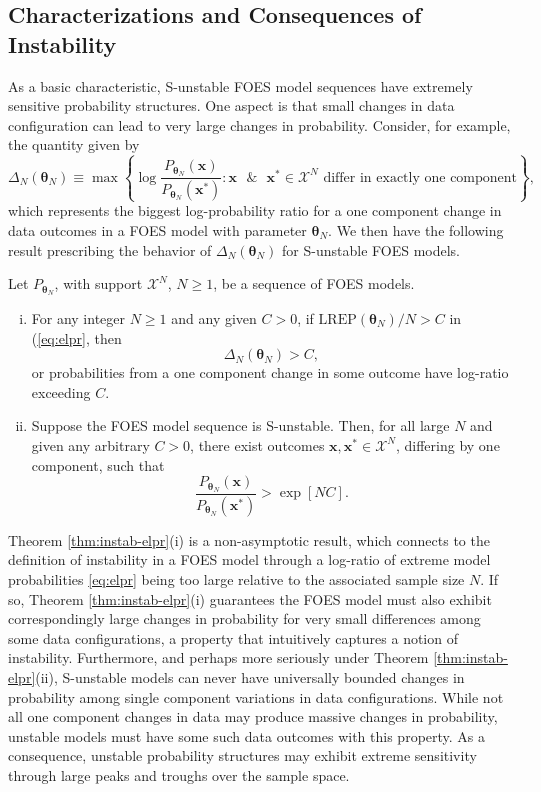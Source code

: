 \documentclass[]{article}
\theoremstyle{definition}
\newcommand{\REP}{\mathrm{LREP}}
\newcommand{\DN}{\Delta_N}
\let\BeginKnitrBlock\begin \let\EndKnitrBlock\end
\begin{document}
\subsection{Characterizations and Consequences of
Instability}\label{characterizations-and-consequences-of-instability}

As a basic characteristic, S-unstable FOES model sequences have
extremely sensitive probability structures. One aspect is that small
changes in data configuration can lead to very large changes in
probability. Consider, for example, the quantity given by \[
\DN(\boldsymbol \theta_N) \equiv \max \left\{\log \frac{P_{\boldsymbol \theta_N}(\boldsymbol x)}{P_{\boldsymbol \theta_N}(\boldsymbol x^*)} : \boldsymbol x \text{ }\& \text{ } \boldsymbol x^* \in \mathcal{X}^N \text{ differ in exactly one component}\right\},
\] which represents the biggest log-probability ratio for a one
component change in data outcomes in a FOES model with parameter
\(\boldsymbol \theta_N\). We then have the following result prescribing
the behavior of \(\DN(\boldsymbol \theta_N)\) for S-unstable FOES
models.

\BeginKnitrBlock{theorem}
\protect\hypertarget{thm:instab-elpr}{}{\label{thm:instab-elpr}}Let
\(P_{\boldsymbol \theta_N}\), with support \(\mathcal{X}^N\),
\(N\geq 1\), be a sequence of FOES models.
\begin{enumerate}[(i)]
\item For any integer $N \geq 1$ and any given $C>0$, if $\REP(\boldsymbol \theta_N)/N > C$ in (\ref{eq:elpr}, then
    $$ \DN(\boldsymbol \theta_N) > C,$$
    or probabilities from a one component change in some outcome have log-ratio exceeding $C$.
\item Suppose the FOES model sequence is S-unstable. Then, for all large $N$ and given any arbitrary $C>0$, there exist outcomes $\boldsymbol x,\boldsymbol x^*\in\mathcal{X}^N$, differing by one component, such that
    $$
    \frac{P_{\boldsymbol \theta_N}(\boldsymbol x)}{P_{\boldsymbol \theta_N}(\boldsymbol x^*)} > \exp[N C].
    $$
\end{enumerate}
\EndKnitrBlock{theorem}

Theorem \ref{thm:instab-elpr}(i) is a non-asymptotic result, which
connects to the definition of instability in a FOES model through a
log-ratio of extreme model probabilities \eqref{eq:elpr} being too large
relative to the associated sample size \(N\). If so, Theorem
\ref{thm:instab-elpr}(i) guarantees the FOES model must also exhibit
correspondingly large changes in probability for very small differences
among some data configurations, a property that intuitively captures a
notion of instability. Furthermore, and perhaps more seriously under
Theorem \ref{thm:instab-elpr}(ii), S-unstable models can never have
universally bounded changes in probability among single component
variations in data configurations. While not all one component changes
in data may produce massive changes in probability, unstable models must
have some such data outcomes with this property. As a consequence,
unstable probability structures may exhibit extreme sensitivity through
large peaks and troughs over the sample space.
\end{document}
